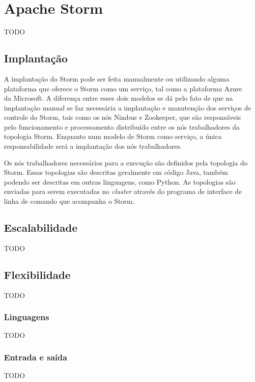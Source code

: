 \section{Apache Storm}

TODO

\subsection{Implantação}

A implantação do Storm pode ser feita manualmente ou utilizando alguma plataforma que oferece o Storm como um serviço, tal como a plataforma Azure da Microsoft. A diferença entre esses dois modelos se dá pelo fato de que na implantação manual se faz necessária a implantação e manutenção dos serviços de controle do Storm, tais como os nós Nimbus e Zookeeper, que são responsáveis pelo funcionamento e processamento distribuído entre os nós trabalhadores da topologia Storm. Enquanto num modelo de Storm como serviço, a única responsabilidade será a implantação dos nós trabalhadores.

Os nós trabalhadores necessários para a execução são definidos pela topologia do Storm. Essas topologias são descritas geralmente em código Java, também podendo ser descritas em outras linguagens, como Python. As topologias são enviadas para serem executadas no \textit{cluster} através do programa de interface de linha de comando que acompanha o Storm.


\subsection{Escalabilidade}

TODO

\subsection{Flexibilidade}

TODO

\subsubsection{Linguagens}

TODO

\subsubsection{Entrada e saída}

TODO


